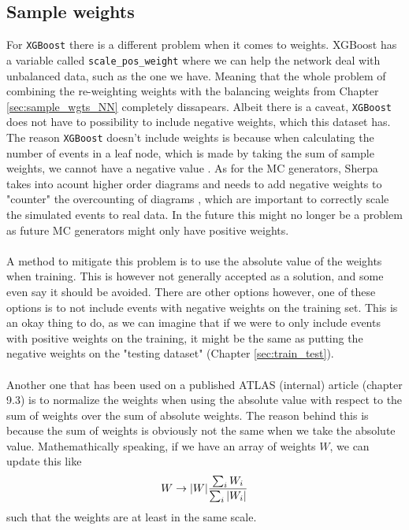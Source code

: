 \documentclass[14pt, a4paper]{book}
\begin{document}
\subsection{Sample weights}
For \verb|XGBoost| there is a different problem when it comes to weights. XGBoost has a variable called \verb|scale_pos_weight| where we can help the network deal with unbalanced data, such as the one we have. 
Meaning that the whole problem of combining the re-weighting weights with the balancing weights from Chapter \ref{sec:sample_wgts_NN} completely dissapears. Albeit there is a caveat, \verb|XGBoost| does not have to possibility to include negative weights, which this dataset has. The reason \verb|XGBoost| 
doesn't include weights is because when calculating the number of events in a leaf node, which is made by taking the sum of sample weights, we cannot have a negative value \cite{neg_wgt_xbg1, neg_wgt_xbg2}.
As for the MC generators, Sherpa \cite{Sherpa} takes into acount higher order diagrams and needs to add negative weights to "counter" the overcounting of diagrams \cite{Negative_Weights_article}, which are important to correctly scale the simulated events to real data.
In the future this might no longer be a problem as  future MC generators might only have positive weights.\\
\\A method to mitigate this problem is to use the absolute value of the weights when training. This is however not generally accepted as a solution, and some even say it should be avoided. There are other options however, one of these options is to not include events with negative weights on the training set. 
This is an okay thing to do, as we can imagine that if we were to only include events with positive weights on the training, it might be the same as putting the negative weights on the "testing dataset" (Chapter \ref{sec:train_test}). \\
\\Another one that has been used on a published ATLAS (internal) article (chapter 9.3) \cite{Abbott:2714377} is to normalize the weights when using the absolute value with respect to the sum of weights over the sum of absolute weights. The reason behind this is because the sum of weights is obviously not the same when we take the absolute value. 
Mathemathically speaking, if we have an array of weights $W$, we can update this like
\begin{equation}\label{eq:ATLAS_wgt}
   W \rightarrow \abs{W}\frac{\sum_i W_i}{\sum_i\abs{W_i}}
\end{equation}
such that the weights are at least in the same scale. 
\end{document}
